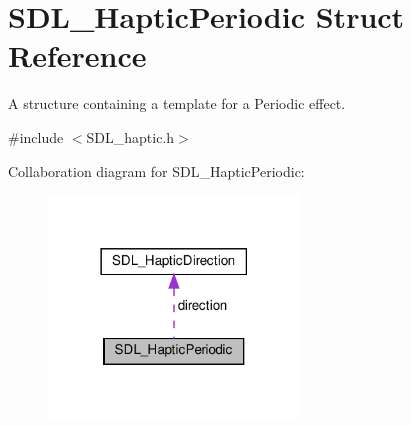 \hypertarget{structSDL__HapticPeriodic}{}\section{S\+D\+L\+\_\+\+Haptic\+Periodic Struct Reference}
\label{structSDL__HapticPeriodic}


A structure containing a template for a Periodic effect.  




{\ttfamily \#include $<$S\+D\+L\+\_\+haptic.\+h$>$}



Collaboration diagram for S\+D\+L\+\_\+\+Haptic\+Periodic\+:\nopagebreak
\begin{figure}[H]
\begin{center}
\leavevmode
\includegraphics[width=189pt]{structSDL__HapticPeriodic__coll__graph}
\end{center}
\end{figure}
